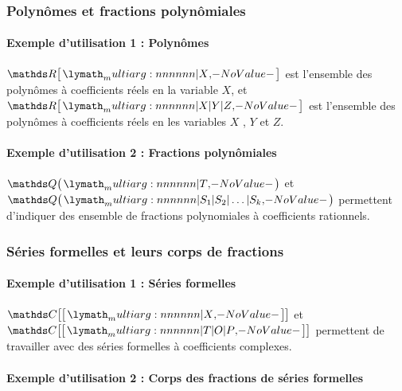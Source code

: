 \documentclass[12pt,a4paper]{article}
\theoremstyle{definition}
\begin{document}
\subsubsection{Polynômes et fractions polynômiales}

\paragraph{Exemple d'utilisation 1 : Polynômes}

\begin{tcblisting}{}
$\polyset{\RR}{X}$ est l'ensemble des polynômes à coefficients réels en la variable
$X$, et $\polyset{\RR}{X | Y | Z}$ est l'ensemble des polynômes à coefficients réels
en les variables $X$ , $Y$ et $Z$.
\end{tcblisting}



\paragraph{Exemple d'utilisation 2 : Fractions polynômiales}

\begin{tcblisting}{}
$\polyfracset{\QQ}{T}$ et $\polyfracset{\QQ}{S_1 | S_2 | \dots | S_k}$ permettent
d'indiquer des ensemble de fractions polynomiales à coefficients rationnels.
\end{tcblisting}



\subsubsection{Séries formelles et leurs corps de fractions}

\paragraph{Exemple d'utilisation 1 : Séries formelles}

\begin{tcblisting}{}
$\serieset{\CC}{X}$ et $\serieset{\CC}{T | O | P}$ permettent de travailler avec des
séries formelles à coefficients complexes.
\end{tcblisting}



\paragraph{Exemple d'utilisation 2 : Corps des fractions de séries formelles}
\end{document}
